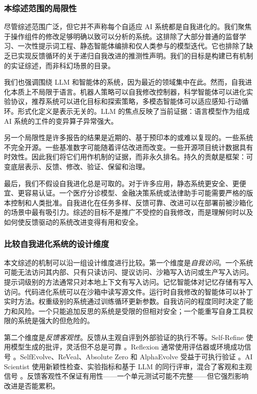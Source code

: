 \subsubsection{本综述范围的局限性}

尽管综述范围广泛，但它并不声称每个自适应 AI 系统都是自我进化的。我们聚焦于操作组件的修改足够明确以致可以分析的系统。这排除了大部分普通的监督学习、一次性提示词工程、静态智能体编排和仅人类参与的模型迭代。它也排除了缺乏已实现反馈循环的关于递归自我改进的推测性声明。我们的目标是构建已有机制的实证综述，而非科幻场景的目录。

我们也强调围绕 LLM 和智能体的系统，因为最近的领域集中在此。然而，自我进化本质上不局限于语言。机器人策略可以自我修改控制器，科学智能体可以进化实验协议，推荐系统可以进化目标和探索策略，多模态智能体可以适应感知-行动循环。形式化定义是表示无关的。LLM 的焦点反映了当前证据：语言模型作为组成 AI 系统的工件的变异算子异常强大。

另一个局限性是许多报告的结果是近期的、基于预印本的或难以复现的。一些系统不完全开源。一些基准数字可能随着评估改进而改变。一些开源项目统计数据具有时效性。因此我们将它们用作机制的证据，而非永久排名。持久的贡献是框架：可变底层表示、反馈、修改、验证、保留和治理。

最后，我们不假设自我进化总是可取的。对于许多应用，静态系统更安全、更便宜、更容易认证。一个医疗分诊模型、金融决策系统或法律助手可能需要严格的版本控制和人类批准。自我进化在任务多样、反馈可靠、改进可以在部署前被沙箱化的场景中最有吸引力。综述的目标不是推广不受控的自我修改，而是理解何时以及如何使反馈驱动的系统改进变得有用和安全。

\subsubsection{比较自我进化系统的设计维度}

本文综述的机制可以沿一组设计维度进行比较。第一个维度是\emph{自我访问}。一个系统可能无法访问其内部、只有只读访问、提议访问、沙箱写入访问或生产写入访问。提示词级别的方法通常只对本地上下文有写入访问。记忆智能体对记忆存储有写入访问。代码进化系统可以在沙箱中读写源文件。运行时自我修改的智能体可以补丁实时方法。权重级别的系统通过训练循环更新参数。自我访问的程度同时决定了能力和风险。一个只能追加反思的系统是受限的但相对安全；一个能重写自身工具权限的系统是强大的但危险的。

第二个维度是\emph{反馈客观性}。反馈从主观自评到外部验证的执行不等。Self-Refine 使用模型生成的批评，灵活但不总是可靠 \cite{selfrefine2023}。Reflexion 通常使用评估器或环境成功信号 \cite{reflexion2023}。SelfEvolve、ReVeal、Absolute Zero 和 AlphaEvolve 受益于可执行验证 \cite{selfevolve2023,reveal2025,absolutezero2025,alphaevolve2025}。AI Scientist 使用新颖性检查、实验指标和基于 LLM 的同行评审，混合了客观和主观信号 \cite{aiscientist2024}。反馈客观性不保证有用性——一个单元测试可能不完整——但它强烈影响改进是否能累积。

